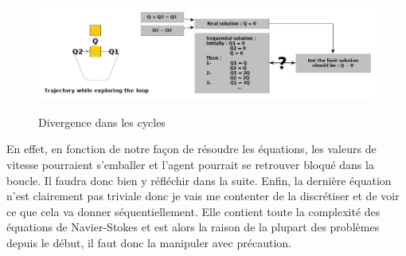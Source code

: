 \documentclass[10pt]{article}
\begin{document}
\begin{figure}[!h]
\centering
\includegraphics[scale=0.45]{ex_div_diverge.jpg}\\
\caption{Divergence dans les cycles}
\label{cycle_div}
\end{figure}

En effet, en fonction de notre façon de résoudre les équations, les valeurs de vitesse pourraient s'emballer et l'agent pourrait se retrouver bloqué dans la boucle. Il faudra donc bien y réfléchir dans la suite. Enfin, la dernière équation n'est clairement pas triviale donc je vais me contenter de la discrétiser et de voir ce que cela va donner séquentiellement. Elle contient toute la complexité des équations de Navier-Stokes et est alors la raison de la plupart des problèmes depuis le début, il faut donc la manipuler avec précaution.
\end{document}
